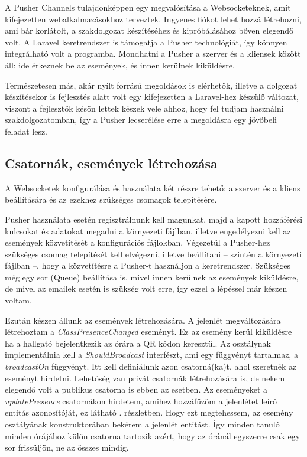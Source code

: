 \documentclass[
]{thesis-ekf}
\theoremstyle{definition}
\theoremstyle{remark}
\begin{document}
A Pusher Channels\cite{pusher} tulajdonképpen egy megvalósítása a Websocketeknek, amit kifejezetten webalkalmazásokhoz terveztek. Ingyenes fiókot lehet hozzá létrehozni, ami bár korlátolt, a szakdolgozat készítéséhez és kipróbálásához bőven elegendő volt. A Laravel keretrendszer is támogatja a Pusher technológiát, így könnyen integrálható volt a programba. Mondhatni a Pusher a szerver és a kliensek között áll: ide érkeznek be az események, és innen kerülnek kiküldésre.

Természetesen más, akár nyílt forrású megoldások is elérhetők, illetve a dolgozat készítésekor is fejlesztés alatt volt egy kifejezetten a Laravel-hez készülő változat, viszont a fejlesztők későn lettek készek vele ahhoz, hogy fel tudjam használni szakdolgozatomban, így a Pusher lecserélése erre a megoldásra egy jövőbeli feladat lesz.

\subsection{Csatornák, események létrehozása}

A Websocketek konfigurálása és használata két részre tehető: a szerver és a kliens beállítására és az ezekhez szükséges csomagok telepítésére.

Pusher használata esetén regisztrálnunk kell magunkat, majd a kapott hozzáférési kulcsokat és adatokat megadni a környezeti fájlban, illetve engedélyezni kell az események közvetítését a konfigurációs fájlokban. Végezetül a Pusher-hez szükséges csomag telepítését kell elvégezni, illetve beállítani -- szintén a környezeti fájlban --, hogy a közvetítésre a Pusher-t használjon a keretrendszer. Szükséges még egy sor (Queue) beállítása is, mivel innen kerülnek az események kiküldésre, de mivel az emailek esetén is szükség volt erre, így ezzel a lépéssel már készen voltam.\cite{broadcasting}

Ezután készen állunk az események létrehozására. A jelenlét megváltozására létrehoztam a \emph{ClassPresenceChanged} eseményt. Ez az esemény kerül kiküldésre ha a hallgató bejelentkezik az órára a QR kódon keresztül. Az osztálynak implementálnia kell a \emph{ShouldBroadcast} interfészt, ami egy függvényt tartalmaz, a \emph{broadcastOn} függvényt. Itt kell definiálunk azon csatorná(ka)t, ahol szeretnék az eseményt hirdetni. Lehetőség van privát csatornák létrehozására is, de nekem elegendő volt a publikus csatorna is ebben az esetben. Az eseményeket a \emph{updatePresence} csatornákon hirdetem, amihez hozzáfűzöm a jelenlétet leíró entitás azonosítóját, ez látható . részletben. Hogy ezt megtehessem, az esemény osztályának konstruktorában bekérem a jelenlét entitást. Így minden tanuló minden órájához külön csatorna tartozik azért, hogy az óránál egyszerre csak egy sor frissüljön, ne az összes mindig.
\end{document}
